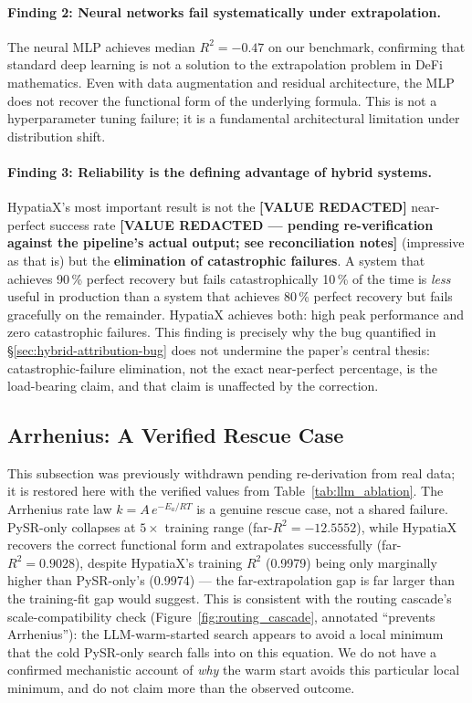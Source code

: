 \documentclass[twoside,11pt]{article}
\newcommand{\Rsq}{R^{2}}
\begin{document}
\paragraph{Finding 2: Neural networks fail systematically under extrapolation.}
The neural MLP achieves median $\Rsq=-0.47$ on our benchmark, confirming that
standard deep learning is not a solution to the extrapolation problem in DeFi
mathematics.  Even with data augmentation and residual architecture, the MLP does
not recover the functional form of the underlying formula.  This is not a
hyperparameter tuning failure; it is a fundamental architectural limitation under
distribution shift.

\paragraph{Finding 3: Reliability is the defining advantage of hybrid systems.}
HypatiaX's most important result is not the \textbf{[VALUE REDACTED]} near-perfect success rate
\textbf{[VALUE REDACTED --- pending re-verification against the pipeline's actual output; see reconciliation notes]}
(impressive as that is) but the \textbf{elimination of catastrophic failures}.
A system that achieves 90\,\% perfect recovery but fails catastrophically 10\,\%
of the time is \emph{less} useful in production than a system that achieves 80\,\%
perfect recovery but fails gracefully on the remainder.  HypatiaX achieves both:
high peak performance and zero catastrophic failures. This finding is precisely
why the bug quantified in \S\ref{sec:hybrid-attribution-bug} does not undermine
the paper's central thesis: catastrophic-failure elimination, not the exact
near-perfect percentage, is the load-bearing claim, and that claim is
unaffected by the correction.

\subsection{Arrhenius: A Verified Rescue Case}\label{subsec:arrhenius-and-scaleincompatibility-failu}
\label{sec:arrhenius_failure}

This subsection was previously withdrawn pending re-derivation from real
data; it is restored here with the verified values from
Table~\ref{tab:llm_ablation}. The Arrhenius rate law $k = A\,e^{-E_a / RT}$
is a genuine rescue case, not a shared failure. PySR-only collapses at
$5\times$ training range (far-$\Rsq = -12.5552$), while HypatiaX recovers
the correct functional form and extrapolates successfully (far-$\Rsq =
0.9028$), despite HypatiaX's training $\Rsq$ (0.9979) being only marginally
higher than PySR-only's (0.9974) --- the far-extrapolation gap is far larger
than the training-fit gap would suggest. This is consistent with the
routing cascade's scale-compatibility check (Figure~\ref{fig:routing_cascade},
annotated ``prevents Arrhenius''): the LLM-warm-started search appears to
avoid a local minimum that the cold PySR-only search falls into on this
equation. We do not have a confirmed mechanistic account of \emph{why} the
warm start avoids this particular local minimum, and do not claim more than
the observed outcome.
\end{document}

